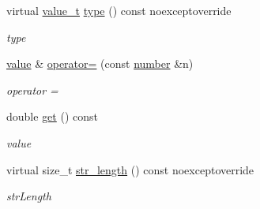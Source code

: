 \begin{DoxyCompactItemize}
virtual \hyperlink{classformat_1_1value_aa0334be06389a7b14af485fa0cd3aa21}{value\+\_\+t} \hyperlink{classformat_1_1number_a1934b4d3cf603de3afd5eb6329be7fba}{type} () const noexceptoverride
\begin{DoxyCompactList}\small\item\em type \end{DoxyCompactList}\item 
\hyperlink{classformat_1_1value_aa6b85823936bf7b8ab78d3f8d443c00d}{value} \& \hyperlink{classformat_1_1number_a6937659eaedafdf0f946af2eeaf72c29}{operator=} (const \hyperlink{classformat_1_1number}{number} \&n)
\begin{DoxyCompactList}\small\item\em operator = \end{DoxyCompactList}\item 
double \hyperlink{classformat_1_1number_a5400100e33e1cc07863820f8be0a330a}{get} () const 
\begin{DoxyCompactList}\small\item\em value \end{DoxyCompactList}\item 
virtual size\+\_\+t \hyperlink{classformat_1_1number_ab7c3bce51e57bc20f3443b74e360e14a}{str\+\_\+length} () const noexceptoverride
\begin{DoxyCompactList}\small\item\em str\+Length \end{DoxyCompactList}\end{DoxyCompactItemize}

